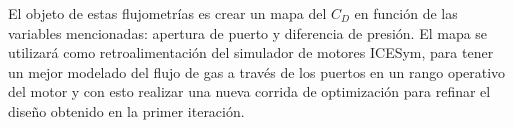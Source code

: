 El objeto de estas flujometrías es crear un mapa del $C_D$ en función de las
variables mencionadas: apertura de puerto y diferencia de presión.
%
El mapa se utilizará como retroalimentación del simulador de motores ICESym,
para tener un mejor modelado del flujo de gas a través de los puertos en un
rango operativo del motor y con esto realizar una nueva corrida de optimización
para refinar el diseño obtenido en la primer iteración.

%



%



%
%


